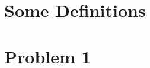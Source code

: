 \documentclass{article}
\begin{document}
\section{Some Definitions}


\section{Problem 1}

\end{document}
